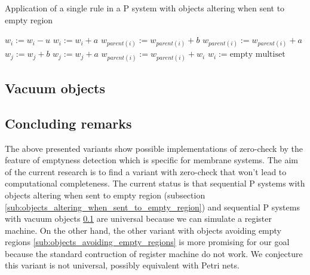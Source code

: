\begin{algorithm}
  \caption{Application of a single rule in a P system with objects altering when sent to empty region}\label{alg:application_of_a_rule_in_a_p_system_with_objects_altering_when_sent_to_empty_region}
  \begin{algorithmic}[1]
      \State $w_i := w_i - u$
        \State $w_i := w_i + a$
      \EndFor
          \State $w_{parent(i)} := w_{parent(i)} + b$
        \Else
          \State $w_{parent(i)} := w_{parent(i)} + a$
        \EndIf
      \EndFor
          \State $w_j := w_j + b$
        \Else
          \State $w_j := w_j + a$
        \EndIf
      \EndFor
        \State $w_{parent(i)} := w_{parent(i)} + w_i$
        \State $w_i := \text{empty multiset}$
      \EndIf
    \EndProcedure
  \end{algorithmic}
\end{algorithm}


\subsection{Vacuum objects} %
\label{sub:vacuum_objects}


\subsection{Concluding remarks} %
\label{sub:concluding_remarks_of_emptyness_detection}

The above presented variants show possible implementations of zero-check by the feature of emptyness detection which is specific for membrane systems. The aim of the current research is to find a variant with zero-check that won't lead to computational completeness. The current status is that sequential P systems with objects altering when sent to empty region (subsection \ref{sub:objects_altering_when_sent_to_empty_region}) and sequential P systems with vacuum objects \ref{sub:vacuum_objects} are universal because we can simulate a register machine. On the other hand, the other variant with objects avoiding empty regions \ref{sub:objects_avoiding_empty_regions} is more promising for our goal because the standard contruction of register machine do not work. We conjecture this variant is not universal, possibly equivalent with Petri nets.

